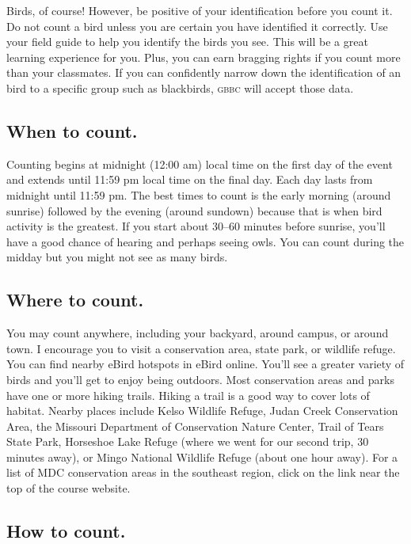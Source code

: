 \documentclass[11pt]{article}
\begin{document}
Birds, of course!  However, be positive of your identification before you count it. Do not count a bird unless you are certain you have identified it correctly.  Use your field guide to help you identify the birds you see. This will be a great learning experience for you. Plus, you can earn bragging rights if you count more than your classmates.  If you can confidently narrow down the identification of an bird to a specific group such as blackbirds, \textsc{gbbc} will accept those data.

\subsection*{When to count.}

Counting begins at midnight (12:00 am) local time on the first day of the event and extends until 11:59 pm local time on the final day. Each day lasts from midnight until 11:59 pm. The best times to count is the early morning (around sunrise) followed by the evening (around sundown) because that is when bird activity is the greatest. If you start about 30--60 minutes before sunrise, you'll have a good chance of hearing and perhaps seeing owls. You can count during the midday but you might not see as many birds.

\subsection*{Where to count.}

You may count anywhere, including your backyard, around campus, or around town. I encourage you to visit a conservation area, state park, or wildlife refuge. You can find nearby eBird hotspots in eBird online. You'll see a greater variety of birds and you'll get to enjoy being outdoors. Most conservation areas and parks have one or more hiking trails. Hiking a trail is a good way to cover lots of habitat.  Nearby places include Kelso Wildlife Refuge, Judan Creek Conservation Area, the Missouri Department of Conservation Nature Center, Trail of Tears State Park, Horseshoe Lake Refuge (where we went for our second trip, 30 minutes away), or Mingo National Wildlife Refuge (about one hour away).  For a list of MDC conservation areas in the southeast region, click on the link near the top of the course website.

\subsection*{How to count.}
\end{document}
